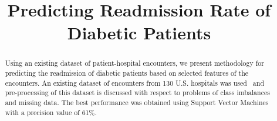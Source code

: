 \documentclass[conference]{IEEEtran}
\begin{document}
%
\title{Predicting Readmission Rate of Diabetic Patients}


\author{
\and
{}
\and
{}
}

\maketitle


\begin{abstract}

Using an existing dataset of patient-hospital encounters, we present methodology for predicting the readmission of diabetic patients based on selected features of the encounters. An existing dataset of encounters from 130 U.S. hospitals was used~\cite{dataset-2014} and pre-processing of this dataset is discussed with respect to problems of class imbalances and missing data. The best performance was obtained using Support Vector Machines with a precision value of 61\%.

\end{abstract}


%
\end{document}
